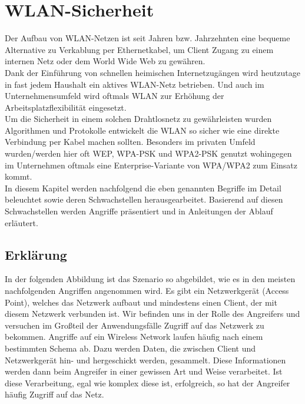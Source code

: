 
\chapter{WLAN-Sicherheit}
\label{ch:WLAN}
Der Aufbau von WLAN-Netzen ist seit Jahren bzw. Jahrzehnten eine bequeme Alternative zu Verkablung per Ethernetkabel, um Client Zugang zu einem internen Netz oder dem World Wide Web zu gewähren. \\
Dank der Einführung von schnellen heimischen Internetzugängen wird heutzutage in fast jedem Haushalt ein aktives WLAN-Netz betrieben. Und auch im Unternehmensumfeld wird oftmals WLAN zur Erhöhung der Arbeitsplatzflexibilität eingesetzt. \\
Um die Sicherheit in einem solchen Drahtlosnetz zu gewährleisten wurden Algorithmen und Protokolle entwickelt die WLAN so sicher wie eine direkte Verbindung per Kabel machen sollten. Besonders im privaten Umfeld wurden/werden hier oft WEP, WPA-PSK und WPA2-PSK genutzt wohingegen im Unternehmen oftmals eine Enterprise-Variante von WPA/WPA2 zum Einsatz kommt. \\
In diesem Kapitel werden nachfolgend die eben genannten Begriffe im Detail beleuchtet sowie deren Schwachstellen herausgearbeitet. Basierend auf diesen Schwachstellen werden Angriffe präsentiert und in Anleitungen der Ablauf erläutert. 

\section{Erklärung}
\label{sc:WLANErklaerung}
In der folgenden Abbildung ist das Szenario so abgebildet, wie es in den meisten nachfolgenden Angriffen angenommen wird. Es gibt ein Netzwerkgerät (Access Point), welches das Netzwerk aufbaut und mindestens einen Client, der mit diesem Netzwerk verbunden ist. Wir befinden uns in der Rolle des Angreifers und versuchen im Großteil der Anwendungsfälle Zugriff auf das Netzwerk zu bekommen.
Angriffe auf ein Wireless Network laufen häufig nach einem bestimmten Schema ab. Dazu werden Daten, die zwischen Client und Netzwerkgerät hin- und hergeschickt werden, gesammelt. Diese Informationen werden dann beim Angreifer in einer gewissen Art und Weise verarbeitet. Ist diese Verarbeitung, egal wie komplex diese ist, erfolgreich, so hat der Angreifer häufig Zugriff auf das Netz.

